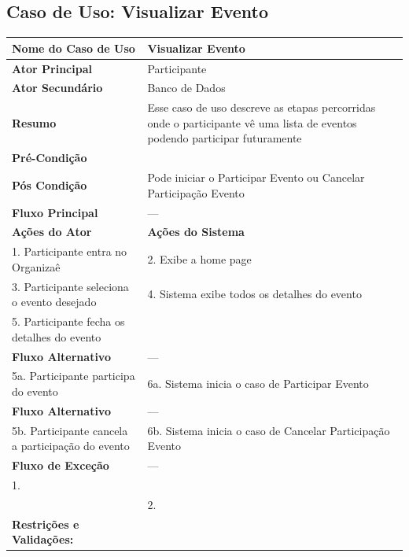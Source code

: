 \documentclass[12pt,a4paper]{article}
\begin{document}
\newpage

\subsection{Caso de Uso: Visualizar Evento}
\begin{longtable}{|p{4cm}|p{11cm}|}
\hline
\textbf{Nome do Caso de Uso} & Visualizar Evento \\ \hline
\textbf{Ator Principal} & Participante \\ \hline
\textbf{Ator Secundário} & Banco de Dados \\ \hline
\textbf{Resumo} & Esse caso de uso descreve as etapas percorridas onde o participante vê uma lista de eventos podendo participar futuramente \\ \hline
\textbf{Pré-Condição} & \\ \hline
\textbf{Pós Condição} & Pode iniciar o Participar Evento ou Cancelar Participação Evento \\ \hline
\textbf{Fluxo Principal} & --- \\ \hline
\textbf{Ações do Ator} & \textbf{Ações do Sistema} \\ \hline
1. Participante entra no Organizaê & 2. Exibe a home page \\ \hline
3. Participante seleciona o evento desejado & 4. Sistema exibe todos os detalhes do evento \\ \hline
5. Participante fecha os detalhes do evento & \\ \hline
\textbf{Fluxo Alternativo} & --- \\ \hline
5a. Participante participa do evento & 6a. Sistema inicia o caso de Participar Evento \\ \hline
\textbf{Fluxo Alternativo} & --- \\ \hline
5b. Participante cancela a participação do evento & 6b. Sistema inicia o caso de Cancelar Participação Evento \\ \hline
\textbf{Fluxo de Exceção} & --- \\ \hline
1. & \\ \hline
& 2. \\ \hline
\textbf{Restrições e Validações:} & \\ \hline
\end{longtable}

\vspace{1cm}

\newpage
\end{document}
